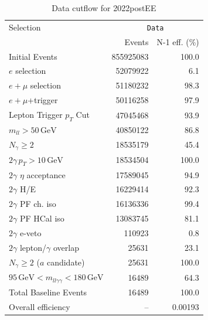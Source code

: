 \begin{table}[htbp]
\centering
\caption{Data cutflow for 2022postEE}
\label{tab:cutflow-data-2022postee}
\footnotesize
\begin{tabular}{lrr}
\hline
Selection & \multicolumn{2}{c}{\texttt{Data}} \\
 & Events & N-1 eff. (\%) \\
\hline
Initial Events & 855925083 & 100.0 \\
$e$ selection & 52079922 & 6.1 \\
$e+\mu$ selection & 51180232 & 98.3 \\
$e+\mu$+trigger & 50116258 & 97.9 \\
Lepton Trigger $p_T$ Cut & 47045468 & 93.9 \\
$m_{ll} > 50\,\mathrm{GeV}$ & 40850122 & 86.8 \\
$N_{\gamma}\geq 2$ & 18535179 & 45.4 \\
$2\gamma\,p_T > 10\,\mathrm{GeV}$ & 18534504 & 100.0 \\
$2\gamma$ $\eta$ acceptance & 17589045 & 94.9 \\
$2\gamma$ H/E & 16229414 & 92.3 \\
$2\gamma$ PF ch. iso & 16136336 & 99.4 \\
$2\gamma$ PF HCal iso & 13083745 & 81.1 \\
$2\gamma$ e-veto & 110923 & 0.8 \\
$2\gamma$ lepton/$\gamma$ overlap & 25631 & 23.1 \\
$N_{\gamma}\geq 2$ ($a$ candidate) & 25631 & 100.0 \\
$95\,\mathrm{GeV} < m_{ll\gamma\gamma} < 180\,\mathrm{GeV}$ & 16489 & 64.3 \\
Total Baseline Events & 16489 & 100.0 \\
\hline
Overall efficiency & -- & 0.00193 \\
\hline
\end{tabular}
\end{table}

